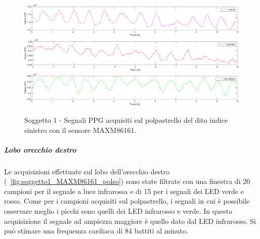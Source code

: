 \begin{figure}[h]
	\centering
	\includegraphics[width=1\linewidth]{ImageFiles/Misure Preliminari/Soggetto 1/MAXM86161/polpastrello_ired}
	\includegraphics[width=1\linewidth]{ImageFiles/Misure Preliminari/Soggetto 1/MAXM86161/polpastrello_red}
	\includegraphics[width=1\linewidth]{ImageFiles/Misure Preliminari/Soggetto 1/MAXM86161/polpastrello_green}
	\caption{Soggetto 1 - Segnali PPG acquisiti sul polpastrello del dito indice sinistro con il sensore MAXM86161.}
	\label{fig:soggetto1_MAXM86161_polpastrello}
\end{figure}

\clearpage

\subparagraph{Lobo orecchio destro}

Le acquisizioni effettuate sul lobo dell'orecchio destro (\Fig~\ref{fig:soggetto1_MAXM86161_polso}) sono state filtrate con una finestra di 20 campioni per il segnale a luce infrarossa e di 15 per i segnali dei LED verde e rosso. Come per i campioni acquisiti sul polpastrello, i segnali in cui è possibile osservare meglio i picchi sono quelli dei LED infrarosso e verde. In questa acquisizione il segnale ad ampiezza maggiore è quello dato dal LED infrarosso. Si può stimare una frequenza cardiaca di 84 battiti al minuto.


